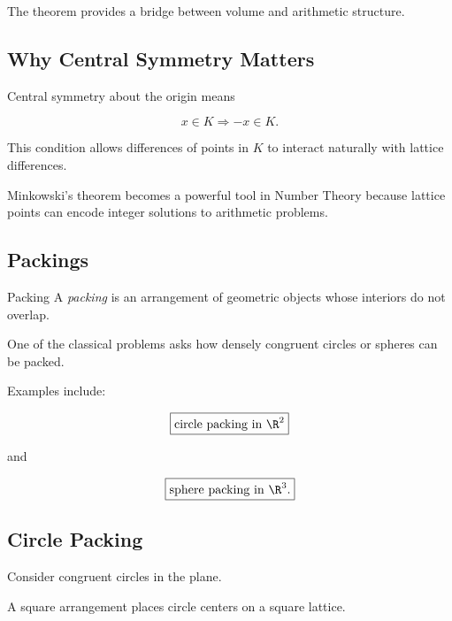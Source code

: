 The theorem provides a bridge between volume and arithmetic structure.

\subsection{Why Central Symmetry Matters}
\label{subsec:minkowski-central-symmetry}

Central symmetry about the origin means

\[
\boxed{
x\in K
\Longrightarrow
-x\in K.
}
\]

This condition allows differences of points in \(K\) to interact naturally
with lattice differences.

Minkowski's theorem becomes a powerful tool in Number Theory because lattice
points can encode integer solutions to arithmetic problems.

\subsection{Packings}
\label{subsec:geometric-packings}

\begin{definitionbox}{Packing}
A \emph{packing} is an arrangement of geometric objects whose interiors do
not overlap.
\end{definitionbox}

One of the classical problems asks how densely congruent circles or spheres
can be packed.

Examples include:

\[
\boxed{
\text{circle packing in }\R^2
}
\]

and

\[
\boxed{
\text{sphere packing in }\R^3.
}
\]

\subsection{Circle Packing}
\label{subsec:circle-packing}

Consider congruent circles in the plane.

A square arrangement places circle centers on a square lattice.

